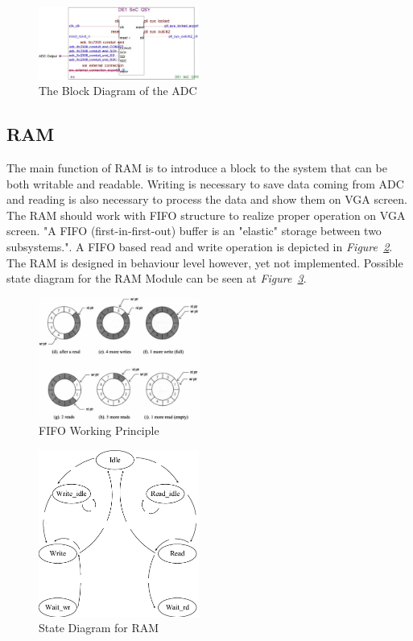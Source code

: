 \documentclass[paper]{IEEEtran}
\begin{document}
		\begin{figure}[t!]
			\setlength{\unitlength}{\textwidth}
			\center 
			\includegraphics[width=0.47\textwidth]{adc_block}
			\caption{\label{fig:adc_block}The Block Diagram of the ADC}
		\end{figure}

\subsection{RAM} \- \indent
	The main function of RAM is to introduce a block to the system that can be both writable and readable. Writing is necessary to save data coming from ADC and reading is also necessary to process the data and show them on VGA screen. The RAM should work with FIFO structure to realize proper operation on VGA screen. "A FIFO (first-in-first-out) buffer is an "elastic" storage between two subsystems."\cite{b3}. A FIFO based read and write operation is depicted in \textit{Figure~\ref{fig:fifo_diagram}}. The RAM is designed in behaviour level however, yet not implemented. Possible state diagram for the RAM Module can be seen at \textit{Figure~\ref{fig:RAM State}}.
	
	\begin{figure}[t!]
		\setlength{\unitlength}{\textwidth}
		\center 
		\includegraphics[width=0.47\textwidth]{fifo_diagram}
		\caption{\label{fig:fifo_diagram}FIFO Working Principle\cite{b3}}
	\end{figure}

\begin{figure}[h!]
			\setlength{\unitlength}{\textwidth}
			\center 
			\includegraphics[width=0.47\textwidth]{RAM_state}
			\caption{\label{fig:RAM State} State Diagram for RAM}
\end{figure}
		
\end{document}
